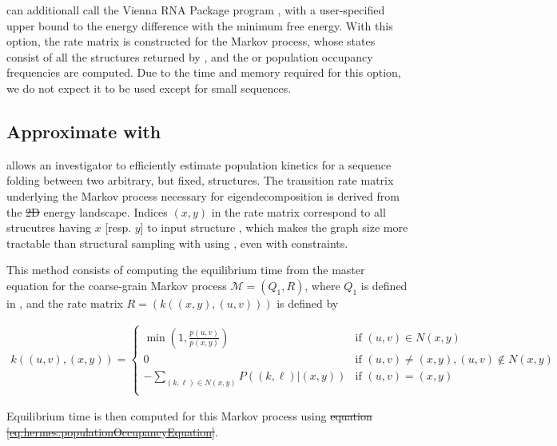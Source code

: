 \documentclass[11pt, oneside]{Thesis} %
\providecommand{\DIFdel}[1]{{\protect\color{red}\sout{#1}}}                      %
\providecommand{\DIFaddbegin}{} %
\providecommand{\DIFaddend}{} %
\providecommand{\DIFdelbegin}{} %
\providecommand{\DIFdelend}{} %
\begin{document}
\rnaeq can additionall call the
Vienna RNA Package program \rnasub \citep{wuchty.b99}, with a
user-specified upper bound to the energy difference with the minimum
free energy. With this option, the rate matrix is
constructed for the Markov process, whose states consist of all
the structures returned by \rnasub, and the \eqt or
population occupancy frequencies are computed. Due to the time
and memory required for this option, we do not expect it to be used except for
small sequences.

\subsection{Approximate \eqt with \ffteq}
\label{subsec:hermes:ffteq}

\ffteq allows an investigator to efficiently estimate population
kinetics for a sequence folding between two arbitrary, but fixed,
structures. The transition rate matrix underlying the Markov process
necessary for eigendecomposition is derived from the \DIFdelbegin \DIFdel{2D }\DIFdelend \DIFaddbegin \twoD \DIFaddend energy
landscape.
Indices $(x,y)$ in the rate matrix correspond to all strucutres having
\bpd $x$ [resp. $y$] to input structure ,
which makes the graph size more tractable than structural
sampling with \rnasub using \rnaeq, even with constraints.

This method consists of computing the equilibrium time
from the master equation for the coarse-grain Markov process
$\mathcal{M}=(Q_1,R)$, where $Q_1$ is defined in
, and the rate matrix
$R = (k((x,y),(u,v)))$ is defined by

\begin{align}
\label{eq:hermes:xitionRateFfttwoWithoutHastings}
k((u,v),(x,y))=
\begin{cases}
\min\left(1, \frac{p(u,v)}{p(x,y)}\right) & \text{if $(u,v) \in N(x,y)$} \\
0 &\text{if $(u,v) \ne (x,y), (u,v) \not\in N(x,y)$} \\
- \sum_{(k,\ell) \in N(x,y)} P((k,\ell)|(x,y)) & \text{if $(u,v)=(x,y)$} \\
\end{cases}
\end{align}

Equilibrium time is then computed for this Markov process using
\DIFdelbegin \DIFdel{equation \ref{eq:hermes:populationOccupancyEquation}}\DIFdelend \DIFaddbegin {}\DIFaddend .
\end{document}
